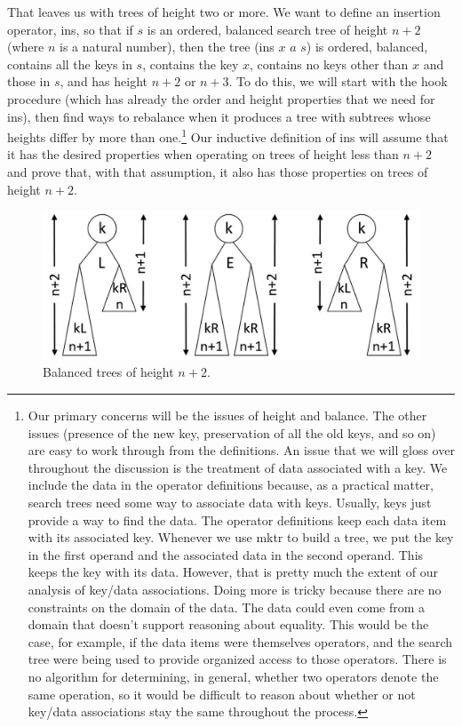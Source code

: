 That leaves us with trees of height two or more.
We want to define an insertion operator, \textsf{ins},
so that
if $s$ is an ordered, balanced search tree
of height $n+2$ (where $n$ is a natural number),
then the tree \textsf{(ins $x$ $a$ $s$)}
is ordered, balanced, contains all the keys in $s$,
contains the key $x$,
contains no keys other than $x$ and those in $s$,
and has height $n+2$ or $n+3$.
To do this,
we will start with the \textsf{hook} procedure
(which has already the order and height properties
that we need for \textsf{ins}),
then find ways to rebalance when it produces
a tree with subtrees whose heights differ by more than one.\footnote{Our
primary concerns will be the issues of height and balance.
The other issues
(presence of the new key, preservation of all the old keys,
and so on)
are easy to work through from the definitions.
An issue that we will gloss over throughout the discussion
is the treatment of data associated with a key.
We include the data in the operator definitions because,
as a practical matter, search trees need some way to
associate data with keys.
Usually, keys just provide a way to find the data.
The operator definitions keep each data item
with its associated key.
Whenever we use \textsf{mktr} to build a tree,
we put the key in the first operand
and the associated data in the second operand.
This keeps the key with its data.
However, that is pretty much the extent of
our analysis of key/data associations.
Doing more is tricky because there are no
constraints on the domain of the data.
The data could even come from a domain
that doesn't support reasoning about equality.
This would be the case, for example, if the data items
were themselves operators, and the search tree
were being used to provide organized access to those
operators. There is no algorithm
for determining, in general, whether two operators
denote the same operation,
so it would be difficult to reason about whether or
not key/data associations stay the same throughout the process.}
Our inductive definition of \textsf{ins} will
assume that it has the desired properties
when operating on trees of height less than $n+2$
and prove that, with that assumption, it also
has those properties on trees of height $n+2$.

\begin{figure}
\begin{center}
\includegraphics[scale=1]{images-cmyk/ht2-or-more}
\end{center}
\caption{Balanced trees of height $n+2$.}
\label{fig:trees-of-ht-n+2}
\end{figure}

